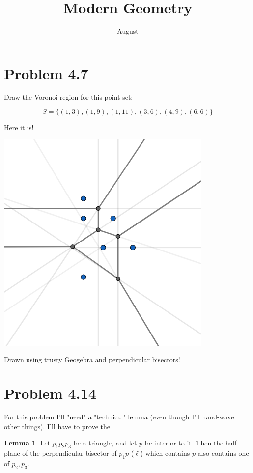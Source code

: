 \documentclass[12pt]{article}
\title{Modern Geometry}
\author{August}
\theoremstyle{definition}
\newtheorem{lemma}{Lemma}
\begin{document}
\maketitle

\section{Problem 4.7}

Draw the Voronoi region for this point set:

\[ S = \{(1,3),(1,9),(1,11),(3,6),(4,9),(6,6)\} \]

Here it is!


\includegraphics[scale=1]{voronoi_4_7.png} 

Drawn using trusty Geogebra and perpendicular bisectors!

\section{Problem 4.14}

For this problem I'll "need" a "technical" lemma (even though I'll hand-wave other things). I'll have to prove the
\begin{lemma}
Let $p_1p_2p_3$ be a triangle, and let $p$ be interior to it. Then the half-plane of the perpendicular bisector of $p_1p$ ($\ell$) which contains $p$ also contains one of $p_2,p_3$.
\end{lemma}
\end{document}
